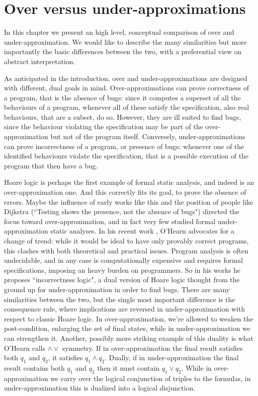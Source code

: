 \chapter{Over versus under-approximations}
In this chapter we present an high level, conceptual comparison of over and under-approximation. We would like to describe the many similarities but more importantly the basic differences between the two, with a preferential view on abstract interpretation.

As anticipated in the introduction, over and under-approximations are designed with different, dual goals in mind.
Over-approximations can prove correctness of a program, that is the absence of bugs: since it computes a superset of all the behaviours of a program, whenever all of these satisfy the specification, also real behaviours, that are a subset, do so. However, they are ill suited to find bugs, since the behaviour violating the specification may be part of the over-approximation but not of the program itself.
Conversely, under-approximations can prove incorrectness of a program, or presence of bugs: whenever one of the identified behaviours violate the specification, that is a possible execution of the program that then have a bug.

Hoare logic \cite{hoare-logic} is perhaps the first example of formal static analysis, and indeed is an over-approximation one. And this correctly fits its goal, to prove the absence of errors. Maybe the influence of early works like this and the position of people like Dijkstra (``Testing shows the presence, not the absence of bugs") directed the focus toward over-approximation, and in fact very few studied formal under-approximation static analyses.
In his recent work \cite{ohearn-incorrectness-logic}, O'Hearn advocates for a change of trend: while it would be ideal to have only provably correct programs, this clashes with both theoretical and practical issues. Program analysis is often undecidable, and in any case is computationally expensive and requires formal specifications, imposing an heavy burden on programmers.
So in his works he proposes ``incorrectness logic", a dual version of Hoare logic thought from the ground up for under-approximation in order to find bugs. There are many similarities between the two, but the single most important difference is the consequence rule, where implications are reversed in under-approximation with respect to classic Hoare logic. In over-approximation, we're allowed to weaken the post-condition, enlarging the set of final states, while in under-approximation we can strengthen it.
Another, possibly more striking example of this duality is what O'Hearn calls $\land \lor$ symmetry. If in over-approximation the final result satisfies both $q_1$ and $q_2$, it satisfies $q_1 \land q_2$. Dually, if in under-approximation the final result contains both $q_1$ and $q_2$ then it must contain $q_1 \lor q_2$. While in over-approximation we carry over the logical conjunction of triples to the formulas, in under-approximation this is dualized into a logical disjunction.

